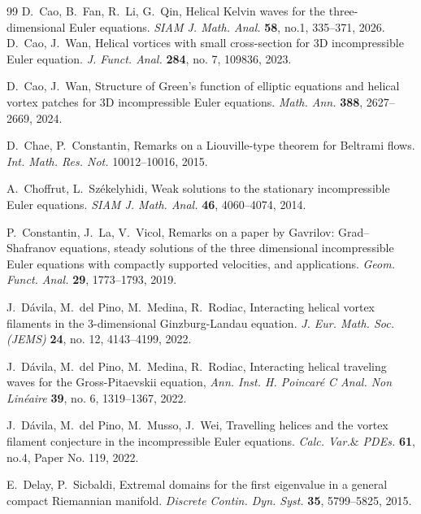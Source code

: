 \documentclass[12pt,reqno]{amsart}
\numberwithin{equation}{section}
\theoremstyle{definition}
\theoremstyle{remark}
\begin{document}
	\begin{thebibliography}{99}	
D.\ Cao, B.\ Fan, R.\ Li, G.\ Qin, Helical Kelvin waves for the three-dimensional Euler equations. \textit{SIAM J. Math. Anal.} \textbf{58}, no.1, 335--371, 2026.
D.\ Cao, J.\ Wan, Helical vortices with small cross-section for 3D incompressible Euler equation. \textit{J. Funct. Anal.} \textbf{284}, no. 7, 109836, 2023.

D.\ Cao, J.\ Wan, Structure of Green's function of elliptic equations and helical vortex patches for 3D incompressible Euler equations. \textit{Math. Ann.} \textbf{388}, 2627--2669, 2024. 
 
D.\ Chae, P.\ Constantin, Remarks on a Liouville-type theorem for Beltrami flows.
\textit{Int. Math. Res. Not.} 10012--10016, 2015.

A.\ Choffrut, L.\ Sz\'ekelyhidi, Weak solutions to the stationary incompressible Euler equations.
\textit{SIAM J. Math. Anal.} \textbf{46}, 4060--4074, 2014.

P.\ Constantin, J.\ La, V.\ Vicol, Remarks on a paper by Gavrilov: Grad--Shafranov equations, steady solutions of the three dimensional incompressible Euler equations with compactly supported velocities, and applications.
\textit{Geom. Funct. Anal.} \textbf{29}, 1773--1793, 2019.

J.\ D\'avila, M.\ del Pino, M.\ Medina, R.\ Rodiac,  Interacting helical
vortex filaments in the 3-dimensional Ginzburg-Landau equation. \textit{J. Eur. Math. Soc. (JEMS)} \textbf{24}, no. 12, 4143--4199, 2022.  %
			
J.\ D\'avila, M.\ del Pino, M.\ Medina, R.\ Rodiac, Interacting helical traveling waves for the Gross-Pitaevskii equation, \textit{Ann. Inst. H. Poincar\'e C Anal. Non Lin\'eaire} \textbf{39}, no. 6, 1319--1367, 2022. %


J.\ D\'avila, M.\ del Pino, M.\ Musso, J.\ Wei, Travelling helices and the vortex filament conjecture in the incompressible Euler equations. \textit{Calc. Var.$\&$ PDEs.}  \textbf{61}, no.4, Paper No. 119, 2022.


E.\ Delay, P.\ Sicbaldi, Extremal domains for the first eigenvalue in a general compact Riemannian manifold.
\textit{Discrete Contin. Dyn. Syst.} \textbf{35}, 5799--5825, 2015.


\end{thebibliography}
\end{document}
